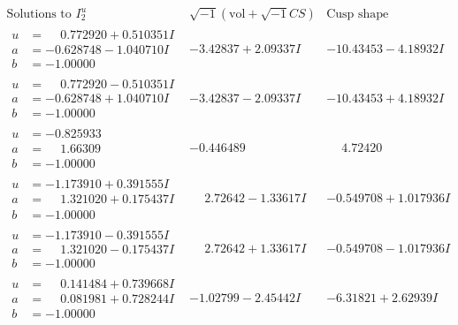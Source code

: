 \documentclass[1p]{elsarticle_modified}
\theoremstyle{definition}
\newcommand{\I}{\sqrt{-1}}
\begin{document}
$$\begin{array}{c|c|c}  
\text{Solutions to }I^u_{2}& \I (\text{vol} + \sqrt{-1}CS) & \text{Cusp shape}\\
 \hline 
\begin{aligned}
u &= \phantom{-}0.772920 + 0.510351 I \\
a &= -0.628748 - 1.040710 I \\
b &= -1.00000\phantom{ +0.000000I}\end{aligned}
 & -3.42837 + 2.09337 I & -10.43453 - 4.18932 I \\ \hline\begin{aligned}
u &= \phantom{-}0.772920 - 0.510351 I \\
a &= -0.628748 + 1.040710 I \\
b &= -1.00000\phantom{ +0.000000I}\end{aligned}
 & -3.42837 - 2.09337 I & -10.43453 + 4.18932 I \\ \hline\begin{aligned}
u &= -0.825933\phantom{ +0.000000I} \\
a &= \phantom{-}1.66309\phantom{ +0.000000I} \\
b &= -1.00000\phantom{ +0.000000I}\end{aligned}
 & -0.446489\phantom{ +0.000000I} & \phantom{-}4.72420\phantom{ +0.000000I} \\ \hline\begin{aligned}
u &= -1.173910 + 0.391555 I \\
a &= \phantom{-}1.321020 + 0.175437 I \\
b &= -1.00000\phantom{ +0.000000I}\end{aligned}
 & \phantom{-}2.72642 - 1.33617 I & -0.549708 + 1.017936 I \\ \hline\begin{aligned}
u &= -1.173910 - 0.391555 I \\
a &= \phantom{-}1.321020 - 0.175437 I \\
b &= -1.00000\phantom{ +0.000000I}\end{aligned}
 & \phantom{-}2.72642 + 1.33617 I & -0.549708 - 1.017936 I \\ \hline\begin{aligned}
u &= \phantom{-}0.141484 + 0.739668 I \\
a &= \phantom{-}0.081981 + 0.728244 I \\
b &= -1.00000\phantom{ +0.000000I}\end{aligned}
 & -1.02799 - 2.45442 I & -6.31821 + 2.62939 I \\ \hline\begin{aligned}

\end{aligned}
\end{array}$$
\end{document}
